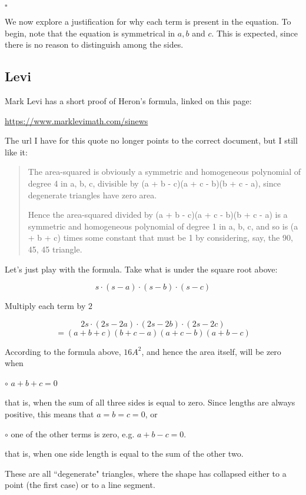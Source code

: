 \documentclass[11pt, oneside]{article}
\begin{document}
$\square$

We now explore a justification for why each term is present in the equation.  To begin, note that the equation is symmetrical in $a,b$ and $c$.  This is expected, since there is no reason to distinguish among the sides.

\subsection*{Levi}

Mark Levi has a short proof of Heron's formula, linked on this page:

\url{https://www.marklevimath.com/sinews}

The url I have for this quote no longer points to the correct document, but I still like it:

\begin{quote}
The area-squared is obviously a symmetric and homogeneous polynomial of degree 4 in a, b, c, divisible by (a + b - c)(a + c - b)(b + c - a), since degenerate triangles have zero area. 

Hence the area-squared divided by (a + b - c)(a + c - b)(b + c - a) is a symmetric and homogeneous polynomial of degree 1 in a, b, c, and so is (a + b + c) times some constant that must be 1 by considering, say, the 90, 45, 45 triangle. \end{quote}

Let's just play with the formula.  Take what is under the square root above:

\[ s \cdot (s-a) \cdot (s-b) \cdot (s-c) \]

Multiply each term by $2$

\[ 2s \cdot (2s - 2a) \cdot (2s - 2b) \cdot (2s - 2c) \]
\[ = (a + b + c)(b + c - a)(a + c - b)(a + b - c) \]

According to the formula above, $16A^2$, and hence the area itself, will be zero when 

$\circ$ $a + b + c = 0$

that is, when the sum of all three sides is equal to zero.  Since lengths are always positive, this means that $a = b = c = 0$, or 

$\circ$ one of the other terms is zero, e.g. $a + b - c = 0$.

that is, when one side length is equal to the sum of the other two.

These are all ``degenerate" triangles, where the shape has collapsed either to a point (the first case) or to a line segment.
\end{document}
